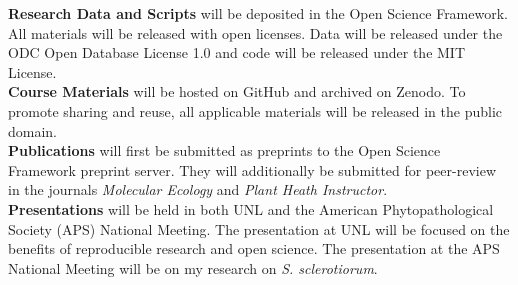 \documentclass[12pt,letterpaper]{article}
\begin{document}
\noindent \textbf{Research Data and Scripts} will be deposited in the Open Science Framework. All materials will be released with open licenses. Data will be released under the ODC Open Database License 1.0 and code will be released under the MIT License. \\
\noindent \textbf{Course Materials} will be hosted on GitHub and archived on Zenodo. To promote sharing and reuse, all applicable materials will be released in the public domain. \\
\noindent \textbf{Publications} will first be submitted as preprints to the Open Science Framework preprint server. They will additionally be submitted for peer-review in the journals \textit{Molecular Ecology} and \textit{Plant Heath Instructor}. \\
\noindent \textbf{Presentations} will be held in both UNL and the American Phytopathological Society (APS) National Meeting. The presentation at UNL will be focused on the benefits of reproducible research and open science. The presentation at the APS National Meeting will be on my research on \textit{S. sclerotiorum}.


\newpage
\AtBeginShipout{%
\AtBeginShipoutDiscard
}

\printbibliography
\end{document}
